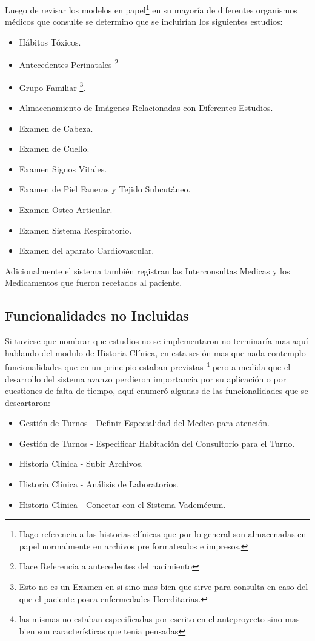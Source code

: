 Luego de revisar los modelos en papel\footnote{Hago referencia a las historias clínicas que por lo general son almacenadas en papel normalmente en archivos pre formateados e impresos.} en su mayoría de diferentes organismos médicos que consulte se determino que se incluirían los siguientes estudios:

\begin{itemize}
    \item Hábitos Tóxicos.
    \item Antecedentes Perinatales \footnote{Hace Referencia a antecedentes del nacimiento}
    \item Grupo Familiar \footnote{Esto no es un Examen en si sino mas bien que sirve para consulta en caso del que el paciente posea enfermedades Hereditarias.}.
    \item Almacenamiento de Imágenes Relacionadas con Diferentes Estudios.
    \item Examen de Cabeza.
    \item Examen de Cuello.
    \item Examen Signos Vitales.
    \item Examen de Piel Faneras y Tejido Subcutáneo.
    \item Examen Osteo Articular.
    \item Examen Sistema Respiratorio.
    \item Examen del aparato Cardiovascular.
\end{itemize}

Adicionalmente el sistema también registran las Interconsultas Medicas y los Medicamentos que fueron recetados al paciente.

\subsection{Funcionalidades no Incluidas}

Si tuviese que nombrar que estudios no se implementaron no terminaría mas aquí hablando del modulo de Historia Clínica, en esta sesión mas que nada contemplo funcionalidades que en un principio estaban previstas \footnote{las mismas no estaban especificadas por escrito en el anteproyecto sino mas bien son características que tenia pensadas} pero a medida que el desarrollo del sistema avanzo perdieron importancia por su aplicación o por cuestiones de falta de tiempo, aquí enumeró algunas de las funcionalidades que se descartaron: \\[0.1cm]

\begin{itemize}
    \item Gestión de Turnos - Definir Especialidad del Medico para atención.
    \item Gestión de Turnos - Especificar Habitación del Consultorio para el Turno.
    \item Historia Clínica - Subir Archivos.
    \item Historia Clínica - Análisis de Laboratorios.
    \item Historia Clínica - Conectar con el Sistema Vademécum.
\end{itemize}

